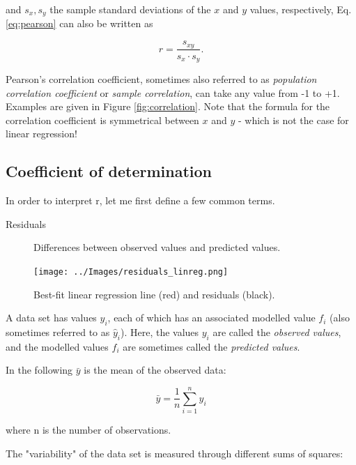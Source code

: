 and $s_x, s_y$ the sample standard deviations of the $x$ and $y$ values, respectively,  Eq. \ref{eq:pearson} can also be written as

\begin{equation}
  r = \frac{s_{xy}}{s_x \cdot s_y}.
\end{equation}

Pearson's correlation coefficient, sometimes also referred to as \emph{population correlation coefficient} or \emph{sample correlation}, can take any value from -1 to +1. Examples are given in Figure \ref{fig:correlation}. Note that the formula for the correlation coefficient is symmetrical between $x$ and $y$ - which is not the case for linear regression!

\subsection{Coefficient of determination}

In order to interpret r, let me first define a few common terms.

\begin{description}
  \item[Residuals] Differences between observed values and predicted values.
\end{description}

\begin{figure}
  \centering
  \texttt{[image: ../Images/residuals\_linreg.png]}\\
  \caption{Best-fit linear regression line (red) and residuals (black). }\label{fig:residuals}
\end{figure}

A data set has values $y_i$, each of which has an associated modelled value $f_i$ (also sometimes referred to as $\hat{y}_i$). Here, the values $y_i$ are called the \emph{observed values}, and the modelled values $f_i$ are sometimes called the \emph{predicted values}.

In the following $\bar{y}$ is the mean of the observed data:

\begin{equation}
  \bar{y}=\frac{1}{n}\sum_{i=1}^n y_i
\end{equation}

where n is the number of observations.

The "variability" of the data set is measured through different sums of squares:

\vspace{5 mm}


